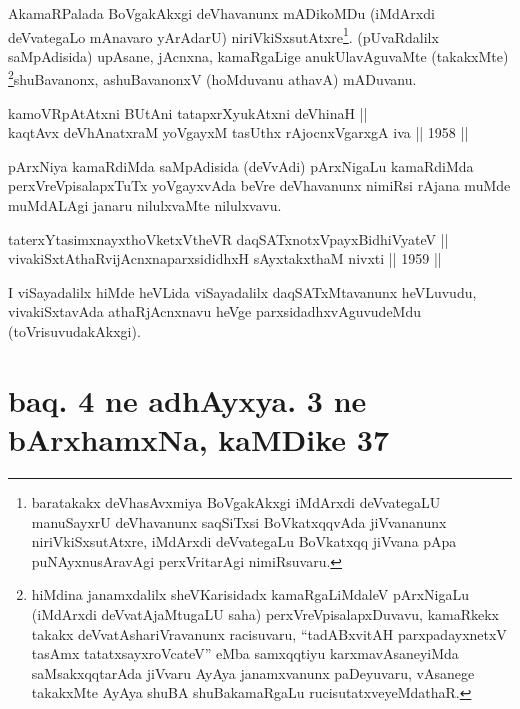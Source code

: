 \begin{artha}
AkamaRPalada BoVgakAkxgi deVhavanunx mADikoMDu (iMdArxdi deVvategaLo
mAnavaro yArAdarU) niriVkiSxsutAtxre\footnote[1]{baratakakx
deVhasAvxmiya BoVgakAkxgi iMdArxdi deVvategaLU manuSayxrU
deVhavanunx saqSiTxsi BoVkatxqqvAda jiVvananunx niriVkiSxsutAtxre,
iMdArxdi deVvategaLu BoVkatxqq jiVvana pApa puNAyxnusAravAgi
perxVritarAgi nimiRsuvaru.}. (pUvaRdalilx
saMpAdisida) upAsane, jAcnxna, kamaRgaLige anukUlavAguvaMte
(takakxMte) \footnote[2]{hiMdina janamxdalilx sheVKarisidadx kamaRgaLiMdaleV pArxNigaLu (iMdArxdi deVvatAjaMtugaLU saha) perxVreVpisalapxDuvavu, kamaRkekx takakx deVvatAshariVravanunx racisuvaru, ``tadABxvitAH parxpadayxnetxV tasAmx tatatxsayxroVcateV'' eMba samxqqtiyu karxmavAsaneyiMda saMsakxqqtarAda jiVvaru AyAya janamxvanunx paDeyuvaru, vAsanege takakxMte AyAya shuBA shuBakamaRgaLu rucisutatxveyeMdathaR.}shuBavanonx, ashuBavanonxV (hoMduvanu athavA) mADuvanu.
\end{artha}

\begin{shl}
kamoVRpAtAtxni BUtAni tatapxrXyukAtxni deVhinaH || \\
kaqtAvx deVhAnatxraM yoVgayxM tasUthx rAjocnxV\s garxgA iva \hfill || 1958 ||
  
\end{shl}

\begin{artha}
pArxNiya kamaRdiMda saMpAdisida (deVvAdi) pArxNigaLu kamaRdiMda
perxVreVpisalapxTuTx yoVgayxvAda beVre deVhavanunx nimiRsi rAjana
muMde muMdALAgi janaru nilulxvaMte nilulxvavu.
\end{artha}

\begin{shl}
taterxYtasimxnayxthoVketxV\s theVR daqSATxnotxV\s payxBidhiVyateV ||  \\
vivakiSxtAthaRvijAcnxnaparxsididhxH sAyxtakxthaM nivxti \hfill || 1959 ||
  
\end{shl}

\begin{artha}
I viSayadalilx hiMde heVLida viSayadalilx daqSATxMtavanunx
heVLuvudu, vivakiSxtavAda athaRjAcnxnavu heVge parxsidadhxvAguvudeMdu
(toVrisuvudakAkxgi).
\end{artha}

\section*{baq. 4 ne adhAyxya. 3 ne bArxhamxNa, kaMDike 37}

